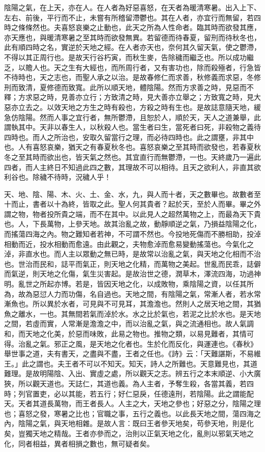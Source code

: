 
陰陽之氣，在上天，亦在人。在人者為好惡喜怒，在天者為暖清寒暑。出入上下、左右、前後，平行而不止，未嘗有所稽留滯鬱也。其在人者，亦宜行而無留，若四時之條條然也。夫喜怒哀樂之止動也，此天之所為人性命者。臨其時而欲發其應，亦天應也，與暖清寒暑之至其時而欲發無異。若留德而待春夏，留刑而待秋冬也，此有順四時之名，實逆於天地之經。在人者亦天也，奈何其久留天氣，使之鬱滯，不得以其正周行也。是故天行谷朽寅，而秋生麥，告除穢而繼乏也。所以成功繼乏，以贍人也。天之生有大經也，而所周行者，又有害功也，除而殺殛者，行急皆不待時也，天之志也，而聖人承之以治。是故春修仁而求善，秋修義而求惡，冬修刑而致清，夏修德而致寬。此所以順天地，體陰陽。然而方求善之時，見惡而不釋；方求惡之時，見善亦立行；方致清之時，見大善亦立舉之；方致寬之時，見大惡亦立去之。以效天地之方生之時有殺也，方殺之時有生也。是故誌意隨天地，緩急仿陰陽。然而人事之宜行者，無所鬱滯，且恕於人，順於天，天人之道兼舉，此謂執其中。天非以春生人，以秋殺人也。當生者曰生，當死者曰死，非殺物之義待四時也。而人之所治也，安取久留當行之理，而必待四時也。此之謂壅，非其中也。人有喜怒哀樂，猶天之有春夏秋冬也。喜怒哀樂之至其時而欲發也，若春夏秋冬之至其時而欲出也，皆天氣之然也。其宜直行而無鬱滯，一也。天終歲乃一遍此四者，而人主終日不知過此四之數，其理故不可以相待。且天之欲利人，非直其欲利谷也。除穢不待時，況穢人乎！


天、地、陰、陽、木、火、土、金、水，九，與人而十者，天之數畢也。故數者至十而止，書者以十為終，皆取之此。聖人何其貴者？起於天，至於人而畢。畢之外謂之物，物者投所貴之端，而不在其中。以此見人之超然萬物之上，而最為天下貴也。人，下長萬物，上參天地。故其治亂之故，動靜順逆之氣，乃損益陰陽之化，而搖蕩四海之內。物之難知者若神，不可謂不然也。今投地死傷而不勝相助，投淖相動而近，投水相動而愈遠。由此觀之，夫物愈淖而愈易變動搖蕩也。今氣化之淖，非直水也。而人主以眾動之無已時，是故常以治亂之氣，與天地之化相而不治也。世治而民和，誌平而氣正，則天地之化精，而萬物之美起。世亂而民乖，誌僻而氣逆，則天地之化傷，氣生災害起。是故治世之德，潤草木，澤流四海，功過神明。亂世之所起亦博。若是，皆因天地之化，以成敗物，乘陰陽之資，以任其所為，故為惡愆人力而功傷，名自過也。天地之間，有陰陽之氣，常漸人者，若水常漸魚也。所以異於水者，可見與不可見耳，其澹澹也。然則人之居天地之間，其猶魚之離水，一也。其無間若氣而淖於水。水之比於氣也，若泥之比於水也。是天地之間，若虛而實，人常漸是澹澹之中，而以治亂之氣，與之流通相也。故人氣調和，而天地之化美，於惡而味敗，此易之物也。推物之類，以易見難者，其情可得。治亂之氣。邪正之風，是天地之化者也。生於化而反化，與運連也。《春秋》舉世事之道，夫有書天，之盡與不盡，王者之任也。《詩》云：「天難諶斯，不易維王。」此之謂也。夫王者不可以不知天。知天，詩人之所難也。天意難見也，其道難理。是故明陽陰、入出、實虛之處，所以觀天之志。辨五行之本末順逆、小大廣狹，所以觀天道也。天誌仁，其道也義。為人主者，予奪生殺，各當其義，若四時；列官置吏，必以其能，若五行；好仁惡戾，任德遠刑，若陰陽。此之謂能配天。天者其道長萬物，而王者長人。人主之大，天地之參也；好惡之分，陰陽之理也；喜怒之發，寒暑之比也；官職之事，五行之義也。以此長天地之間，蕩四海之內，陰陽之氣，與天地相雜。是故人言：既曰王者參天地矣，苟參天地，則是化矣，豈獨天地之精哉。王者亦參而之，治則以正氣天地之化，亂則以邪氣天地之化，同者相益，異者相損之數也，無可疑者矣。

